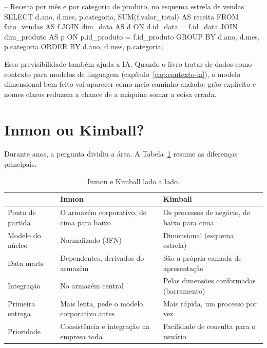 \begin{sql}
-- Receita por mês e por categoria de produto, no esquema estrela de vendas
SELECT
    d.ano,
    d.mes,
    p.categoria,
    SUM(f.valor_total) AS receita
FROM fato_vendas  AS f
JOIN dim_data     AS d ON d.id_data    = f.id_data
JOIN dim_produto  AS p ON p.id_produto = f.id_produto
GROUP BY d.ano, d.mes, p.categoria
ORDER BY d.ano, d.mes, p.categoria;
\end{sql}

Essa previsibilidade também ajuda a IA. Quando o livro tratar de dados como contexto
para modelos de linguagem (capítulo~\ref{cap:contexto-ia}), o modelo dimensional bem
feito vai aparecer como meio caminho andado: grão explícito e nomes claros reduzem a
chance de a máquina somar a coisa errada.

\section{Inmon ou Kimball?}
\label{sec:inmon-ou-kimball}

Durante anos, a pergunta dividiu a área. A Tabela~\ref{tab:inmon-kimball} resume as
diferenças principais.

\begin{table}[htbp]
  \centering
  \caption{Inmon e Kimball lado a lado.}
  \label{tab:inmon-kimball}
  \small
  \begin{tabularx}{\textwidth}{@{}>{\raggedright\arraybackslash}p{}
      >{\raggedright\arraybackslash}X>{\raggedright\arraybackslash}X@{}}
    \toprule
    & Inmon & Kimball \\
    \midrule
    Ponto de partida & O armazém corporativo, de cima para baixo & Os processos de negócio, de baixo para cima \\
    \addlinespace
    Modelo do núcleo & Normalizado (3FN) & Dimensional (esquema estrela) \\
    \addlinespace
    Data marts & Dependentes, derivados do armazém & São a própria camada de apresentação \\
    \addlinespace
    Integração & No armazém central & Pelas dimensões conformadas (barramento) \\
    \addlinespace
    Primeira entrega & Mais lenta, pede o modelo corporativo antes & Mais rápida, um processo por vez \\
    \addlinespace
    Prioridade & Consistência e integração na empresa toda & Facilidade de consulta para o usuário \\
    \bottomrule
  \end{tabularx}
\end{table}

